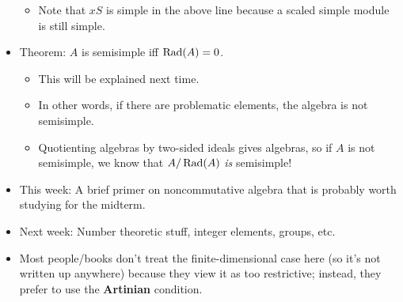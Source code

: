 \documentclass[../notes.tex]{subfiles}
\begin{document}
\begin{itemize}
\begin{itemize}
\begin{itemize}
        \end{itemize}
        \item Note that $xS$ is simple in the above line because a scaled simple module is still simple.
    \end{itemize}
    \item Theorem: $A$ is semisimple iff $\operatorname{Rad}(A)=0$.
    \begin{itemize}
        \item This will be explained next time.
        \item In other words, if there are problematic elements, the algebra is not semisimple.
        \item Quotienting algebras by two-sided ideals gives algebras, so if $A$ is not semisimple, we know that $A/\operatorname{Rad}(A)$ \emph{is} semisimple!
    \end{itemize}
    \item This week: A brief primer on noncommutative algebra that is probably worth studying for the midterm.
    \item Next week: Number theoretic stuff, integer elements, groups, etc.
    \item Most people/books don't treat the finite-dimensional case here (so it's not written up anywhere) because they view it as too restrictive; instead, they prefer to use the \textbf{Artinian} condition.
\end{itemize}
\end{document}

